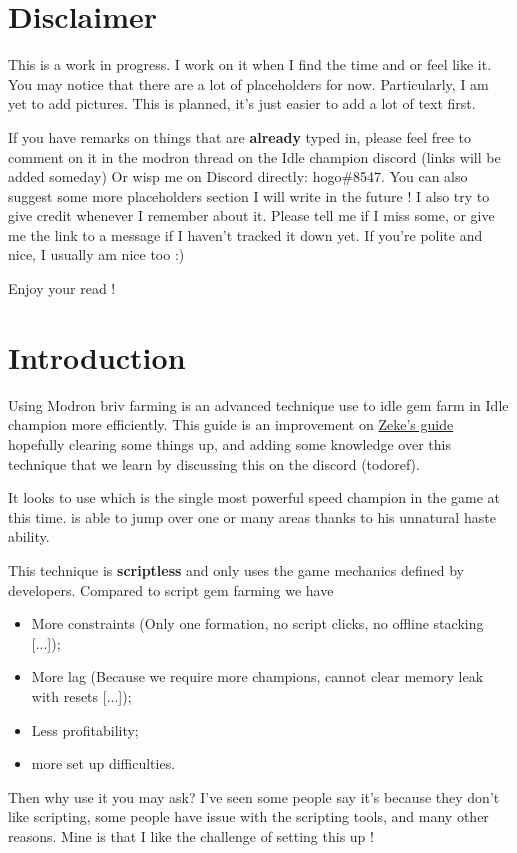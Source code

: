 \documentclass{article}
\begin{document}
\newcommand{\vjara}{Vjara\xspace}

\section{Disclaimer}

This is a work in progress.
I work on it when I find the time and or feel like it.
You may notice that there are a lot of placeholders for now.
Particularly, I am yet to add pictures.
This is planned, it's just easier to add a lot of text first.

If you have remarks on things that are \textbf{already} typed in, please feel free to comment on it in the modron \briv thread on the Idle champion discord (links will be added someday) Or wisp me on Discord directly: hogo\#8547.
You can also suggest some more placeholders section I will write in the future !
I also try to give credit whenever I remember about it.
Please tell me if I miss some, or give me the link to a message if I haven't tracked it down yet.
If you're polite and nice, I usually am nice too :)

Enjoy your read !

\section{Introduction}

Using Modron briv farming is an advanced technique use to idle gem farm in Idle champion more efficiently.
This guide is  an improvement on  \href{https://www.reddit.com/r/idlechampions/comments/rbldh0/automated_briv_stacking_without_scripting/}{Zeke's guide} hopefully clearing some things up, and adding some knowledge over this technique that we learn by discussing this on the discord (todoref).

It looks to use \textbf{\briv} which is the single most powerful speed champion in the game at this time.
\briv is able to jump over one or many areas thanks to his unnatural haste ability.

This technique is \textbf{scriptless} and only uses the game mechanics defined by developers.
Compared to script gem farming we have
\begin{itemize}
    \item More constraints (Only one formation, no script clicks, no offline stacking [...]);
    \item More lag (Because we require more champions, cannot clear memory leak with resets [...]);
    \item Less profitability;
    \item more set up difficulties. 
\end{itemize}
Then why use it you may ask?
I've seen some people say it's because they don't like scripting, some people have issue with the scripting tools, and many other reasons.
Mine is that I like the challenge of setting this up !
\end{document}
